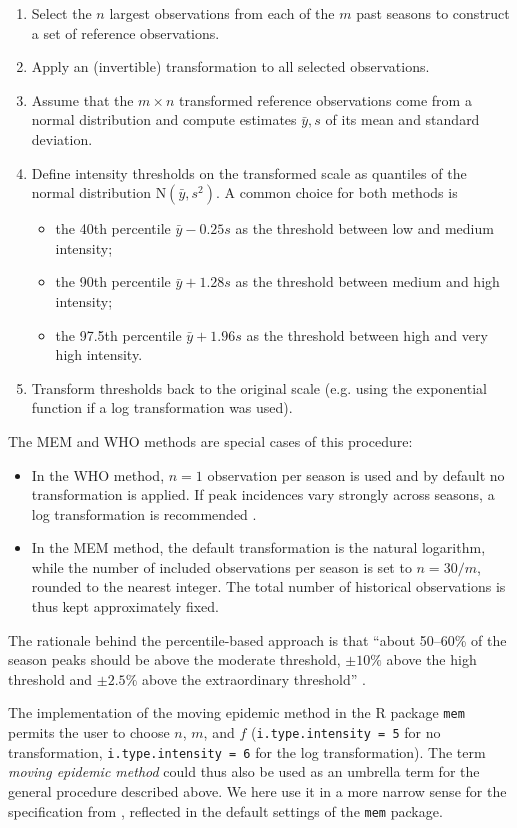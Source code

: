 \documentclass{article}
\newcommand{\sd}{s}
\newcommand{\mean}{\bar{y}}
\begin{document}
\begin{enumerate}
\item Select the $n$ largest observations from each of the $m$ past seasons to construct a set of reference observations.
\item Apply an (invertible) transformation to all selected observations.
\item Assume that the $m \times n$ transformed reference observations come from a normal distribution and compute estimates $\mean, \sd$ of its mean and standard deviation.
\item Define intensity thresholds on the transformed scale as quantiles of the normal distribution N$(\mean, \sd^2)$. A common choice for both methods is
\begin{itemize}
\item the 40th percentile $\mean - 0.25 \sd$ as the threshold between low and medium intensity;
\item the 90th percentile $\mean + 1.28 \sd$ as the threshold between medium and high intensity;
\item the 97.5th percentile $\mean + 1.96\sd$ as the threshold between high and very high intensity.
\end{itemize}
\item Transform thresholds back to the original scale (e.g. using the exponential function if a log transformation was used).
\end{enumerate}

\noindent The MEM and WHO methods are special cases of this procedure:
\begin{itemize}
\item In the WHO method, $n = 1$ observation per season is used and by default no transformation is applied. If peak incidences vary strongly across seasons, a log transformation is recommended \citep{WHO2017}. 
\item In the MEM method, the default transformation is the natural logarithm, while the number of included observations per season is set to $n = 30/m$, rounded to the nearest integer. The total number of historical observations is thus kept approximately fixed.
\end{itemize}
The rationale behind the percentile-based approach is that ``about 50--60\% of the season peaks should be above the moderate threshold, $\pm 10\%$ above the high threshold and $\pm 2.5\%$ above the extraordinary threshold'' \citep[p.10]{WHO2017}.

The implementation of the moving epidemic method in the R package \texttt{mem} \citep{Lozano2020} permits the user to choose $n$, $m$, and $f$ (\texttt{i.type.intensity	= 5} for no transformation, \texttt{i.type.intensity = 6} for the log transformation). The term \textit{moving epidemic method} could thus also be used as an umbrella term for the general procedure described above. We here use it in a more narrow sense for the specification from \cite{Vega2015}, reflected in the default settings of the \texttt{mem} package.
\end{document}
